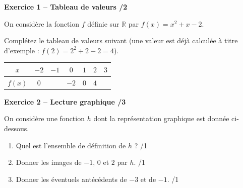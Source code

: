 \documentclass[10pt,a4paper]{article}
\begin{document}
\newpage



\textbf{Exercice 1 -- Tableau de valeurs \hfill /2}

On considère la fonction \(f\) définie sur \(\mathbb{R}\) par \(f(x)=x^2+x-2\).

Complétez le tableau de valeurs suivant (une valeur est déjà calculée à titre d'exemple : \(f(2)=2^2+2-2=4\)).

\begin{center}
    \renewcommand{\arraystretch}{1.5}
    \setlength{\tabcolsep}{0.25cm}
    \begin{tabular}{|*{7}{c|}}
    \hline
    \(x\) & \(-2\) & \(-1\) & \(0\) & \(1\) & \(2\) & \(3\) \\
    \hline
    \(f(x)\) & \(0\) & & \(-2\) & \(0\) & \(4\) & \\
    \hline
    \end{tabular}
\end{center}

\vspace{3cm}

\textbf{Exercice 2 -- Lecture graphique \hfill /3}

On considère une fonction \(h\) dont la représentation graphique est donnée ci-dessous.

\begin{center}
\end{center}

\begin{enumerate}
    \item Quel est l'ensemble de définition de \(h\) ? \hfill /1
    \item Donner les images de \(-1\), \(0\) et \(2\) par \(h\). \hfill /1
    \item Donner les éventuels antécédents de \(-3\) et de \(-1\). \hfill /1
\end{enumerate}
\end{document}
